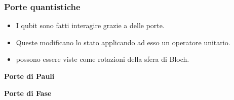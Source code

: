 \documentclass[aspectratio=169]{beamer}
\begin{document}
\begin{frame}
	\frametitle{Porte quantistiche}

	\begin{itemize}
		\item I qubit sono fatti interagire grazie a delle porte.
		      \pause
		\item Queste modificano lo stato applicando ad esso un operatore unitario.
		      \pause
		\item possono essere viste come rotazioni della sfera di Bloch.
	\end{itemize}

	\vspace{10pt}

	\pause

	\begin{minipage}{0.24\textwidth}
		\begin{center}
			\textbf{Porte di Pauli}\\
			\vspace{10pt}
			\begin{quantikz}
			\end{quantikz}
			\begin{quantikz}
				\gate{Y}
			\end{quantikz}
			\begin{quantikz}
				\gate{Z}
			\end{quantikz}
		\end{center}

	\end{minipage}
	\begin{minipage}{0.24\textwidth}
		\begin{center}
			\textbf{Porte di Fase}\\
			\vspace{10pt}
			\begin{quantikz}
				\gate{S}
			\end{quantikz}
			\begin{quantikz}
				\gate{T}
			\end{quantikz}
			\begin{quantikz}
				\gate{P}
			\end{quantikz}
		\end{center}


\end{minipage}
\end{frame}
\end{document}
